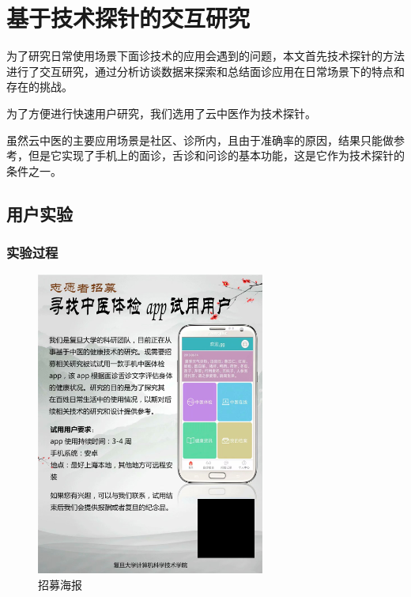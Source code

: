 \chapter{基于技术探针的交互研究}

为了研究日常使用场景下面诊技术的应用会遇到的问题，本文首先技术探针\cite{Hutchinson2003Technology}的方法进行了交互研究，通过分析访谈数据来探索和总结面诊应用在日常场景下的特点和存在的挑战。

为了方便进行快速用户研究，我们选用了云中医\cite{Zhang2018Study}作为技术探针。

虽然云中医的主要应用场景是社区、诊所内，且由于准确率的原因，结果只能做参考，但是它实现了手机上的面诊，舌诊和问诊的基本功能，这是它作为技术探针的条件之一。

\section{用户实验}
 
\subsection{实验过程}
\begin{figure}[h]
    \centering
    \includegraphics[height=10cm]{images/poster.png}
    \caption{招募海报}
    \label{fig:poster}
\end{figure}


